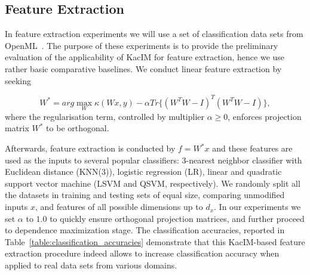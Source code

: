 \documentclass{article}
\begin{document}
\subsection{Feature Extraction}
In feature extraction experiments we will use a set of classification data sets from OpenML~\cite{OpenML2013}. The purpose of these experiments is to provide the preliminary evaluation of the applicability of KacIM for feature extraction, hence we use rather basic comparative baselines. We conduct linear feature extraction by seeking 

\begin{equation}
\label{eq:kim_feature_extraction}    
W^{*} = arg \max_{W} \kappa(Wx, y) - \alpha Tr\{(W^{T}W-I)^{T}(W^{T}W-I) \},
\end{equation}
where the regularisation term, controlled by multiplier $\alpha \geq 0$, enforces projection matrix $W^{*}$ to be orthogonal.


\noindent Afterwards, feature extraction is conducted by $f = W^{*}x$ and these features are used as the inputs to several popular classifiers: $3$-nearest neighbor classifier with Euclidean distance (KNN(3)), logistic regression (LR), linear and quadratic support vector machine\cite{?} (LSVM and QSVM, respectively). We randomly split all the datasets in training and testing sets of equal size, comparing unmodified inputs $x$, and features of all possible dimensions up to $d_{x}$.  In our experiments we set $\alpha$ to $1.0$ to quickly ensure orthogonal projection matrices, and further proceed to dependence maximization stage. 
The classification accuracies, reported in Table~\ref{table:classification_accuracies} demonstrate that this KacIM-based feature extraction procedure indeed allows to increase classification accuracy when applied to real data sets from various domains.
\end{document}
